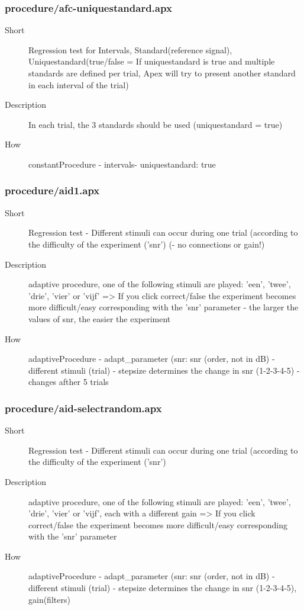 \subsubsection{procedure/afc-uniquestandard.apx}
\begin{description}
\item[Short] 
 Regression test for Intervals, Standard(reference signal), Uniquestandard(true/false = If uniquestandard is true and multiple standards are defined per trial, Apex will try to present another standard in each interval of the trial)
\item[Description] 
 In each trial, the 3 standards should be used (uniquestandard = true)
\item[How] 
 constantProcedure - intervals- uniquestandard: true
\end{description}

\subsubsection{procedure/aid1.apx}
\begin{description}
\item[Short] 
 Regression test - Different stimuli can occur during one trial (according to the difficulty of the experiment ('snr') (- no connections or gain!)
\item[Description] 
 adaptive procedure, one of the following stimuli are played: 'een', 'twee', 'drie', 'vier' or 'vijf' =\textgreater{} If you click correct/false the experiment becomes more difficult/easy corresponding with the 'snr' parameter - the larger the values of snr, the easier the experiment
\item[How] 
 adaptiveProcedure - adapt\_parameter (snr: snr (order, not in dB) - different stimuli (trial) - stepsize determines the change in snr (1-2-3-4-5) - changes afther 5 trials
\end{description}

\subsubsection{procedure/aid-selectrandom.apx}
\begin{description}
\item[Short] 
 Regression test - Different stimuli can occur during one trial (according to the difficulty of the experiment ('snr')
\item[Description] 
 adaptive procedure, one of the following stimuli are played: 'een', 'twee', 'drie', 'vier' or 'vijf', each with a different gain =\textgreater{} If you click correct/false the experiment becomes more difficult/easy corresponding with the 'snr' parameter
\item[How] 
 adaptiveProcedure - adapt\_parameter (snr: snr (order, not in dB) - different stimuli (trial) - stepsize determines the change in snr (1-2-3-4-5), gain(filters)
\end{description}

